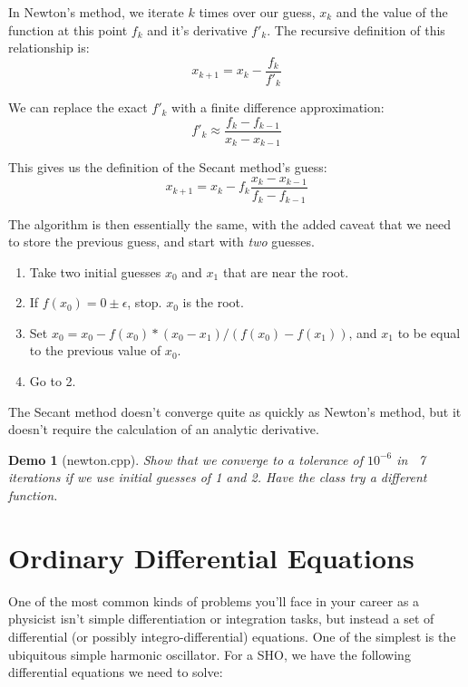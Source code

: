 \documentclass{article}
\theoremstyle{demo}
\newtheorem{demo}{Demo}[section]
\begin{document}
In Newton's method, we iterate $k$ times over our guess, $x_k$ and the value of
the function at this point $f_k$ and it's derivative $f'_k$.  The recursive
definition of this relationship is:
\begin{equation}
    x_{k+1} = x_k - \frac{f_k}{f'_k}
\end{equation}

We can replace the exact $f'_k$ with a finite difference approximation:
\begin{equation}
    f'_k \approx \frac{f_k - f_{k-1}}{x_k-x_{k-1}}
\end{equation}

This gives us the definition of the Secant method's guess:
\begin{equation}
    x_{k+1} = x_k - f_k\frac{x_k-x_{k-1}}{f_k-f_{k-1}}
\end{equation}

The algorithm is then essentially the same, with the added caveat that we need
to store the previous guess, and start with \textit{two} guesses.
\begin{enumerate}
    \item Take two initial guesses $x_0$ and $x_1$ that are near the root.
    \item If $f(x_0) = 0 \pm \epsilon$, stop.  $x_0$ is the root.
    \item Set $x_0 = x_0 - f(x_0)*(x_0-x_1)/(f(x_0)-f(x_1))$, and $x_1$ to be
        equal to the previous value of $x_0$.
    \item Go to 2.
\end{enumerate}

The Secant method doesn't converge quite as quickly as Newton's method, but it
doesn't require the calculation of an analytic derivative.

\begin{demo}[newton.cpp]
    Show that we converge to a tolerance of $10^{-6}$ in ~7 iterations if we
    use initial guesses of 1 and 2.  Have the class try a different function.
\end{demo}

\section{Ordinary Differential Equations}
One of the most common kinds of problems you'll face in your career as a
physicist isn't simple differentiation or integration tasks, but instead a set
of differential (or possibly integro-differential) equations.  One of the
simplest is the ubiquitous simple harmonic oscillator.  For a SHO, we have the
following differential equations we need to solve:
\end{document}
